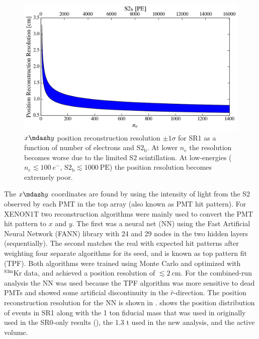 \begin{figure}
\centering
\includegraphics[width=\textwidth]{PosRecRes}
\caption{$x \mdash y$ position reconstruction resolution $\pm 1\sigma$ for SR1 as a function of number of electrons and
$\mathrm{S2_b}$.  At lower $n_e$ the
resolution becomes worse due to the limited S2 scintillation.  At low-energies ($n_e \lesssim 100\ e^-$,
$\mathrm{S2_b} \lesssim 1000\ \mathrm{PE}$) the position resolution becomes extremely poor.}
\label{fig:calibrations_position_reconstruction_res}
\end{figure}

The $x \mdash y$ coordinates are found by using the intensity of light from the S2 observed by each PMT in the top array (also
known as PMT hit pattern).  For XENON1T two reconstruction algorithms were mainly used to convert the PMT hit pattern to $x$ and $y$.  The
first was a neural net (NN) using the Fast Artificial
Neural Network (FANN) library with 24 and 29 nodes in the two hidden layers (sequentially).  The second matches the real with expected hit
patterns after weighting four separate algorithms for its seed, and is known as top pattern fit (TPF).  Both algorithms were trained using
Monte Carlo and optimized with $\mathrm{^{83m}Kr}$ data, and achieved a position resolution of $\lesssim 2\ \mathrm{cm}$.  For the
combined-run analysis the NN was used because the TPF algorithm was more sensitive to dead PMTs and showed some artificial discontinuity
in the $\hat{r}$-direction.  The position reconstruction resolution for the NN is shown in
.   shows the position distribution
of events in SR1 along with
the 1 ton fiducial mass that was used in originally used in the SR0-only results (), the 1.3 t used in the new
analysis, and the active volume.

